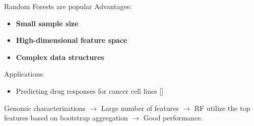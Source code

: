 \documentclass[notes]{beamer}          %
\begin{document}
\begin{frame}{Random Forests are popular}
Advantages: 
\begin{itemize}
    \item \textbf{Small sample size}
    \item \textbf{High-dimensional feature space}
    \item \textbf{Complex data structures}  \newline
\end{itemize} 

Applications: 
\begin{itemize}
 \item Predicting drug responses for cancer cell lines [] \newline
\end{itemize} \newline

Genomic characterizations $\rightarrow$ Large number of features \break $\rightarrow$ RF utilize the top features based on bootstrap aggregation \break $\rightarrow$ Good performance.

\end{frame}
\end{document}
